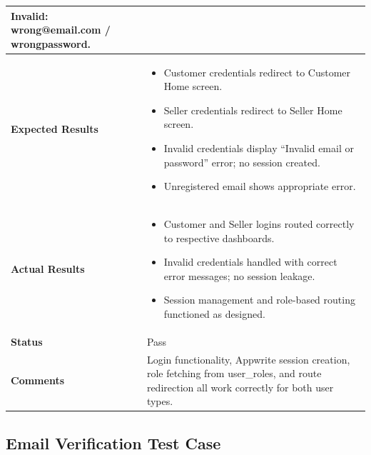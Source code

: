 \begin{table}[H]
\begin{tabular}{|p{3.2cm}|p{10.8cm}|}
Invalid: wrong@email.com / wrongpassword. \\ \hline
\textbf{Expected Results} &
\begin{itemize}[leftmargin=*,noitemsep]
\item Customer credentials redirect to Customer Home screen.
\item Seller credentials redirect to Seller Home screen.
\item Invalid credentials display ``Invalid email or password'' error; no session created.
\item Unregistered email shows appropriate error.
\end{itemize} \\ \hline
\textbf{Actual Results} &
\begin{itemize}[leftmargin=*,noitemsep]
\item Customer and Seller logins routed correctly to respective dashboards.
\item Invalid credentials handled with correct error messages; no session leakage.
\item Session management and role-based routing functioned as designed.
\end{itemize} \\ \hline
\textbf{Status} & Pass \\ \hline
\textbf{Comments} & Login functionality, Appwrite session creation, role fetching from user\_roles, and route redirection all work correctly for both user types. \\ \hline
\end{tabular}
\end{table}

\newpage
\subsection{Email Verification Test Case}


